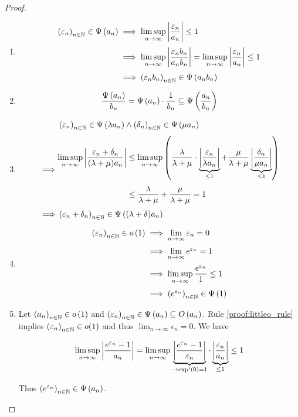\begin{proof}
\begin{enumerate}
    \item

      \begin{align}
        \seq{\epsilon_n} \in \bigpsi{a_n}  & \implies \limsup_{n\to\infty} \abs{\frac{\epsilon_n}{a_n}} \le 1 \nl
        & \implies \limsup_{n\to\infty} \abs{\frac{\epsilon_n b_n}{a_n b_n}} = \limsup_{n\to\infty} \abs{\frac{\epsilon_n}{a_n}} \le 1 \nl
        & \implies \seq{\epsilon_n b_n} \in \bigpsi{a_n b_n}
      \end{align}

    \item

      \begin{align}
        \frac{\Psi\left( {a_n} \right)}{b_n} = \Psi\left( {a_n} \right) \cdot \frac{1}{b_n} \subseteq \Psi\left( {\frac{a_n}{b_n}} \right)
      \end{align}

    \item

      \begin{align}
        & \seq{\epsilon_n} \in \bigpsi{\lambda a_n} \land \seq{\delta_n} \in \bigpsi{\mu a_n} \nl
        \implies &
        \begin{aligned}
          \limsup_{n\to\infty} \abs{\frac{\epsilon_n+\delta_n}{(\lambda+\mu)a_n}} & \le \limsup_{n\to\infty} \left( \frac{\lambda}{\lambda + \mu} \cdot \underbrace{\abs{\frac{\epsilon_n}{\lambda a_n}}}_{\le 1} + \frac{\mu}{\lambda + \mu} \underbrace{\abs{\frac{\delta_n}{\mu a_n}}}_{\le 1} \right) \nl
          &\le \frac{\lambda}{\lambda+\mu} + \frac{\mu}{\lambda+\mu} = 1
        \end{aligned} \nl
        \implies & \seq{\epsilon_n+\delta_n} \in \bigpsi{(\lambda+\delta)a_n}
      \end{align}
    \item

      \begin{align}
        \seq{\epsilon_n} \in \littleo{1} & \implies \lim_{n\to\infty} \epsilon_n = 0 \nl
        & \implies \lim_{n\to\infty} e^{\epsilon_n} = 1 \nl
        & \implies \limsup_{n\to\infty} \frac{e^{\epsilon_n}}{1} \le 1 \nl
        & \implies \seq{e^{\epsilon_n}} \in \bigpsi{1}
      \end{align}

    \item

      Let $\left({a_n}\right)_{{n}\in\mathbb N}\in o\left( {1} \right)$ and $\left({\varepsilon_n}\right)_{{n}\in\mathbb N}\in\Psi\left( {a_n} \right)\subseteq O\left( {a_n} \right)$. Rule \ref{proof:littleo_rule} implies $\left({\varepsilon_n}\right)_{{n}\in\mathbb N} \in o(1)$ and thus $\lim_{n\to\infty} \epsilon_n = 0$. We have

      \begin{align}
        \limsup_{n\to\infty} \left|{\frac{e^{\varepsilon_n}-1}{a_n}}\right| = \limsup_{n\to\infty} \underbrace{\left|{\frac{e^{\varepsilon_n}-1}{\varepsilon_n}}\right|}_{\to \exp'(0)=1} \cdot \underbrace{\left|{\frac{\varepsilon_n}{a_n}}\right|}_{\le 1} \le 1
      \end{align}

      \noindent Thus $\left({e^{\varepsilon_n}}\right)_{{n}\in\mathbb N} \in \Psi\left( {a_n} \right)$.
  \end{enumerate}
\end{proof}

